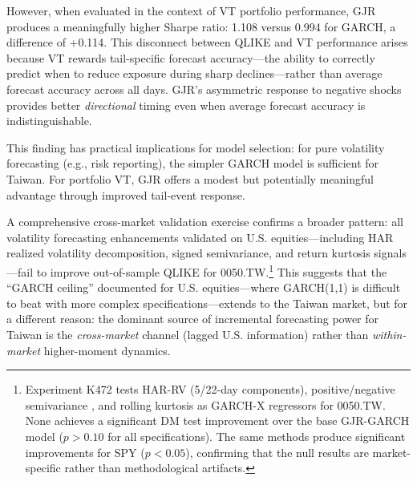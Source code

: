 However, when evaluated in the context of VT portfolio performance, GJR produces a meaningfully higher Sharpe ratio: 1.108 versus 0.994 for GARCH, a difference of +0.114. This disconnect between QLIKE and VT performance arises because VT rewards tail-specific forecast accuracy---the ability to correctly predict when to reduce exposure during sharp declines---rather than average forecast accuracy across all days. GJR's asymmetric response to negative shocks provides better \textit{directional} timing even when average forecast accuracy is indistinguishable.

This finding has practical implications for model selection: for pure volatility forecasting (e.g., risk reporting), the simpler GARCH model is sufficient for Taiwan. For portfolio VT, GJR offers a modest but potentially meaningful advantage through improved tail-event response.

A comprehensive cross-market validation exercise confirms a broader pattern: all volatility forecasting enhancements validated on U.S. equities---including HAR realized volatility decomposition, signed semivariance, and return kurtosis signals---fail to improve out-of-sample QLIKE for 0050.TW.\footnote{Experiment K472 tests HAR-RV \citep{corsi2009} (5/22-day components), positive/negative semivariance \citep{barndorff2010}, and rolling kurtosis as GARCH-X regressors for 0050.TW. None achieves a significant DM test improvement over the base GJR-GARCH model ($p > 0.10$ for all specifications). The same methods produce significant improvements for SPY ($p < 0.05$), confirming that the null results are market-specific rather than methodological artifacts.} This suggests that the ``GARCH ceiling'' documented for U.S. equities---where GARCH(1,1) is difficult to beat with more complex specifications---extends to the Taiwan market, but for a different reason: the dominant source of incremental forecasting power for Taiwan is the \textit{cross-market} channel (lagged U.S. information) rather than \textit{within-market} higher-moment dynamics.

